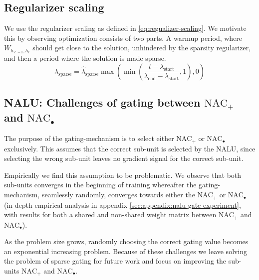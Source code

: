 \subsection{Regularizer scaling}
We use the regularizer scaling as defined in \eqref{eq:regualizer-scaling}. We motivate this by observing optimization consists of two parts. A warmup period, where $W_{h_{\ell-1},h_\ell}$ should get close to the solution, unhindered by the sparsity regularizer, and then a period where the solution is made sparse.
\begin{equation}
\lambda_{\mathrm{sparse}} = \hat{\lambda}_{\mathrm{sparse}} \max\left(\min\left(\frac{t - \lambda_{\mathrm{start}}}{\lambda_{\mathrm{end}} - \lambda_{\mathrm{start}}}, 1\right), 0\right)
\label{eq:regualizer-scaling}
\end{equation}

\subsection{NALU: Challenges of gating between \texorpdfstring{$\text{NAC}_{+}$}{NAC-add} and \texorpdfstring{$\text{NAC}_{\bullet}$}{NAC-mul}}
\label{sec:methods:gatting-issue}
The purpose of the gating-mechanism is to select either $\text{NAC}_{+}$ or $\text{NAC}_{\bullet}$ exclusively.
This assumes that the correct sub-unit is selected by the NALU, since selecting the wrong sub-unit leaves no gradient signal for the correct sub-unit.

Empirically we find this assumption to be problematic.
We observe that both sub-units converges in the beginning of training whereafter the gating-mechanism, seamlessly randomly, converges towards either the $\text{NAC}_{+}$ or $\text{NAC}_{\bullet}$ (in-depth empirical analysis in appendix \ref{sec:appendix:nalu-gate-experiment}, with results for both a shared and non-shared weight matrix between $\text{NAC}_{+}$ and $\text{NAC}_{\bullet}$).

As the problem size grows, randomly choosing the correct gating value becomes an exponential increasing problem. Because of these challenges we leave solving the problem of sparse gating for future work and focus on improving the sub-units $\text{NAC}_{+}$ and $\text{NAC}_{\bullet}$.